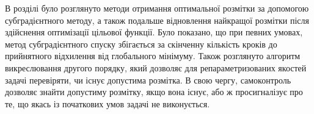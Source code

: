 \chapterConclusion

В розділі було розглянуто методи отримання оптимальної розмітки за допомогою
субградієнтного методу, а також подальше відновлення найкращої розмітки після 
здійснення оптимізації цільової функції. Було показано, що при певних умовах, 
метод субградієнтного спуску збігається за скінченну кількість кроків до прийнятного 
відхилення від глобального мінімуму. Також розглянуто алгоритм викреслювання другого порядку, 
який дозволяє для репараметризованих якостей задачі перевіряти, чи існує допустима розмітка.
В свою чергу, самоконтроль дозволяє знайти допустиму розмітку, якщо вона існує, або ж
просигналізує про те, що якась із початкових умов задачі не виконується.
